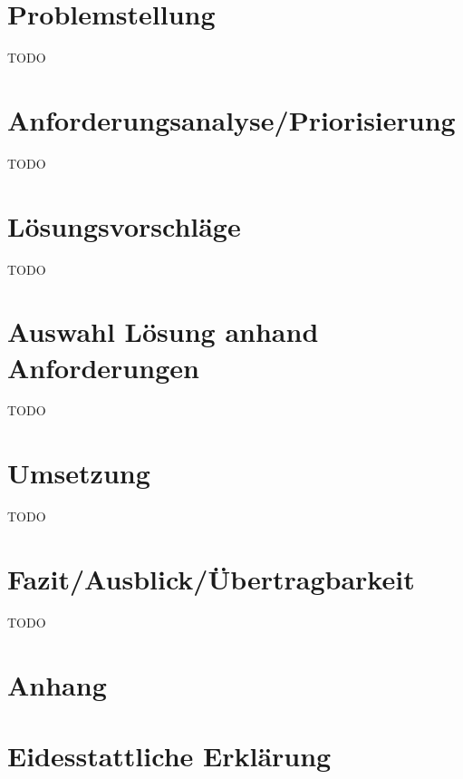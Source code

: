 \documentclass[a4paper,11pt,singlespacing]{article}
\begin{document}
\section{Problemstellung}\label{sec:Problemstellung}
	TODO


\section{Anforderungsanalyse/Priorisierung}\label{sec:AnforderungsanalysePriorisierung}
	TODO


\section{Lösungsvorschläge}\label{sec:Lösungsvorschläge}
	TODO


\section{Auswahl Lösung anhand Anforderungen}\label{sec:AuswahlLösungAnhandAnforderungen}
	TODO


\section{Umsetzung}\label{sec:Umsetzung}
	TODO


\section{Fazit/Ausblick/Übertragbarkeit}\label{sec:Fazit/Ausblick/Übertragbarkeit}
	TODO





\listoffigures
{}

\lstlistoflistings
{}

\newpage

\section*{Anhang}\label{Anhang}

\newpage

\section*{Eidesstattliche Erklärung}\label{sec:Eidesstattliche Erklärung}
\end{document}
